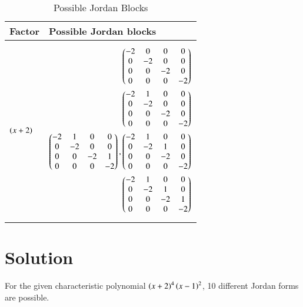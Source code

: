 \documentclass[journal,12pt,twocolumn]{IEEEtran}
\numberwithin{table}{section}
\begin{document}
\begin{table*}[ht!]
\begin{center}
\begin{tabular}{|l|l|}
\hline
\textbf{Factor} & \textbf{Possible Jordan blocks} \\[0.5ex]
\hline
 $\left(x+2\right)$ & \parbox{10cm}{\begin{align}
\begin{pmatrix}-2&0&0&0\\0&-2&0&0\\0&0&-2&0\\0&0&0&-2\end{pmatrix}\\
\begin{pmatrix}-2&1&0&0\\0&-2&0&0\\0&0&-2&0\\0&0&0&-2\end{pmatrix}\\
\begin{pmatrix}-2&1&0&0\\0&-2&0&0\\0&0&-2&1\\0&0&0&-2\end{pmatrix},\begin{pmatrix}-2&1&0&0\\0&-2&1&0\\0&0&-2&0\\0&0&0&-2\end{pmatrix}\\
\begin{pmatrix}-2&1&0&0\\0&-2&1&0\\0&0&-2&1\\0&0&0&-2\end{pmatrix}
\end{align}}
\\ [0.5ex] 
\hline
$\brak{x-1}$ & \parbox{10cm}{\begin{align}
\myvec{1&0\\0&1}\\\myvec{1&1\\0&1}
\end{align}}
\\ [0.5ex] 
\hline
\end{tabular}
\caption{Possible Jordan Blocks}
\label{table:1}
\end{center}
\vspace{-0.5cm}
\end{table*}
\section{Solution}
For the given characteristic polynomial $\left(x+2\right)^4\left(x-1\right)^2$, 10 different Jordan forms are possible.
\end{document}
